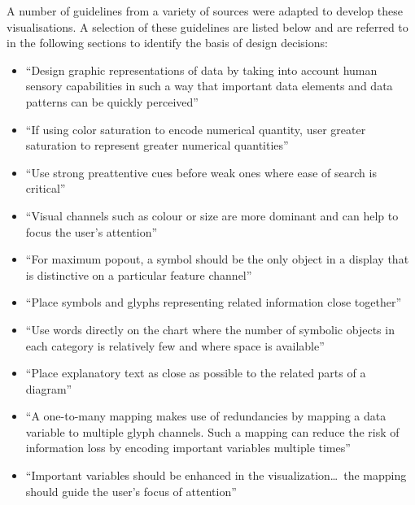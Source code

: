 A number of guidelines from a variety of sources were adapted to develop these visualisations. A selection of these guidelines are listed below and are referred to in the following sections to identify the basis of design decisions:
\begin{itemize}
\item ``Design graphic representations of data by taking into account human sensory capabilities in such a way that important data elements and data patterns can be quickly perceived''~\cite[p.~14]{Ware2013a} 
\item ``If using color saturation to encode numerical quantity, user greater saturation to represent greater numerical quantities''~\cite[p.~117]{Ware2013a} 
\item ``Use strong preattentive cues before weak ones where ease of search is critical''~\cite[p.~156]{Ware2013a} 
\item ``Visual channels such as colour or size are more dominant and can help to focus the user's attention''~\cite[p.~45]{Borgo2013} 
\item ``For maximum popout, a symbol should be the only object in a display that is distinctive on a particular feature channel''~\cite[p.~157]{Ware2013a} 
\item ``Place symbols and glyphs representing related information close together''~\cite[p.~181]{Ware2013a} 
\item ``Use words directly on the chart where the number of symbolic objects in each category is relatively few and where space is available''~\cite[p.~321]{Ware2013a} 
\item ``Place explanatory text as close as possible to the related parts of a diagram''~\cite[p.~333]{Ware2013a} 
\item ``A one-to-many mapping makes use of redundancies by mapping a data variable to multiple glyph channels. Such a mapping can reduce the risk of information loss by encoding important variables multiple times''~\cite[p.~52]{Borgo2013} 
\item ``Important variables should be enhanced in the visualization\ldots~the mapping should guide the user's focus of attention''~\cite[p.~52]{Borgo2013} 
\end{itemize}

